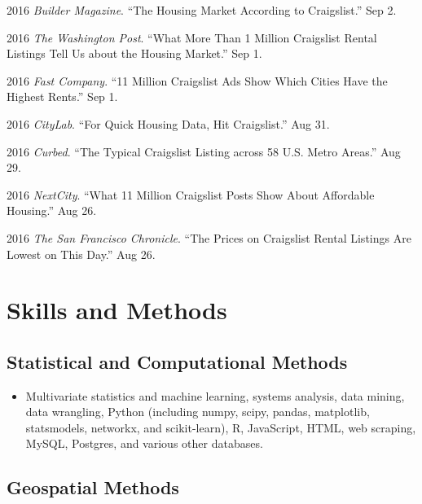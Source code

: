 \documentclass{academiccv}
\begin{document}
\begin{tablist}
\item 2016 \tab \textit{Builder Magazine}. \enquote{The Housing Market According to Craigslist.} Sep 2.

\item 2016 \tab \textit{The Washington Post}. \enquote{What More Than 1 Million Craigslist Rental Listings Tell Us about the Housing Market.} Sep 1.

\item 2016 \tab \textit{Fast Company}. \enquote{11 Million Craigslist Ads Show Which Cities Have the Highest Rents.} Sep 1.

\item 2016 \tab \textit{CityLab}. \enquote{For Quick Housing Data, Hit Craigslist.} Aug 31.

\item 2016 \tab \textit{Curbed}. \enquote{The Typical Craigslist Listing across 58 U.S. Metro Areas.} Aug 29.

\item 2016 \tab \textit{NextCity}. \enquote{What 11 Million Craigslist Posts Show About Affordable Housing.} Aug 26.

\item 2016 \tab \textit{The San Francisco Chronicle}. \enquote{The Prices on Craigslist Rental Listings Are Lowest on This Day.} Aug 26.

\end{tablist}



\section*{Skills and Methods}

\subsection*{Statistical and Computational Methods}

\begin{itemize}
	
\item Multivariate statistics and machine learning, systems analysis, data mining, data wrangling, Python (including numpy, scipy, pandas, matplotlib, statsmodels, networkx, and scikit-learn), R, JavaScript, HTML, web scraping, MySQL, Postgres, and various other databases.

\end{itemize}

\subsection*{Geospatial Methods}
\end{document}
